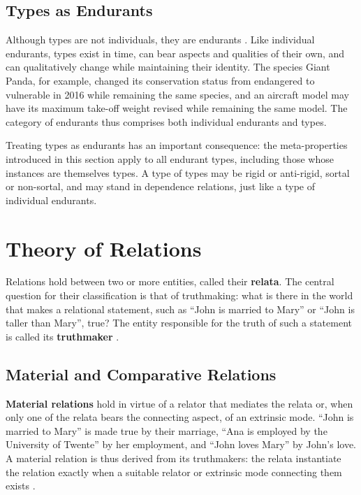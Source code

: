 \subsection{Types as Endurants}

Although types are not individuals, they are endurants \cite{incorporating_types_of_types_in_ontology_driven_conceptual_modeling_2022}. Like individual endurants, types exist in time, can bear aspects and qualities of their own, and can qualitatively change while maintaining their identity. The species Giant Panda, for example, changed its conservation status from endangered to vulnerable in 2016 while remaining the same species, and an aircraft model may have its maximum take-off weight revised while remaining the same model. The category of endurants thus comprises both individual endurants and types.

Treating types as endurants has an important consequence: the meta-properties introduced in this section apply to all endurant types, including those whose instances are themselves types. A type of types may be rigid or anti-rigid, sortal or non-sortal, and may stand in dependence relations, just like a type of individual endurants.

\section{Theory of Relations}

Relations hold between two or more entities, called their \textbf{relata}. The central question for their classification is that of truthmaking: what is there in the world that makes a relational statement, such as ``John is married to Mary'' or ``John is taller than Mary'', true? The entity responsible for the truth of such a statement is called its \textbf{truthmaker} \cite{guarino2015we}.

\subsection{Material and Comparative Relations}

\textbf{Material relations} hold in virtue of a relator that mediates the relata or, when only one of the relata bears the connecting aspect, of an extrinsic mode. ``John is married to Mary'' is made true by their marriage, ``Ana is employed by the University of Twente'' by her employment, and ``John loves Mary'' by John's love. A material relation is thus derived from its truthmakers: the relata instantiate the relation exactly when a suitable relator or extrinsic mode connecting them exists \cite{guizzardi2008relationship,guarino2015we}.

